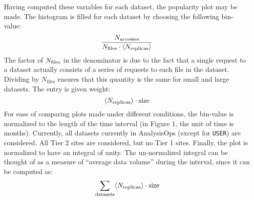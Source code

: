 Having computed these variables for each dataset, the popularity plot may be made. The histogram is filled for each dataset by choosing the following bin-value:
\begin{equation}\dfrac{N_\text{accesses}}{N_\text{files}\cdot \langle N_\text{replicas}\rangle}\end{equation}
The factor of $N_\text{files}$ in the denominator is due to the fact that a single request to a dataset actually consists of a series of requests to each file in the dataset. Dividing by $N_\text{files}$ ensures that this quantity is the same for small and large datasets. The entry is given weight:
\begin{equation}
\langle N_\text{replicas}\rangle\cdot \text{size}
\end{equation}
For ease of comparing plots made under different conditions, the bin-value is normalized to the length of the time interval (in Figure 1, the unit of time is months). Currently, all datasets currently in AnalysisOps (except for \verb|USER|) are considered. All Tier 2 sites are considered, but no Tier 1 sites. Finally, the plot is normalized to have an integral of unity. The un-normalized integral can be thought of as a measure of ``average data volume'' during the interval, since it can be computed as:
\[\sum_\text{datasets} \langle N_\text{replicas}\rangle \cdot \text{size}\]
